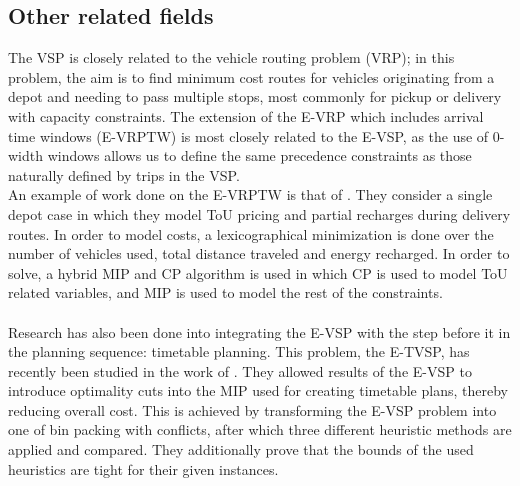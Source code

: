 \documentclass[]{article}
\begin{document}
\subsection{Other related fields}
The VSP is closely related to the vehicle routing problem (VRP); in this problem, the aim is to find minimum cost routes for vehicles originating from a depot and needing to pass multiple stops, most commonly for pickup or delivery with capacity constraints. The extension of the E-VRP which includes arrival time windows (E-VRPTW) is most closely related to the E-VSP, as the use of 0-width windows allows us to define the same precedence constraints as those naturally defined by trips in the VSP. \\
An example of work done on the E-VRPTW is that of \citet{Ham2021}. They consider a single depot case in which they model ToU pricing and partial recharges during delivery routes. In order to model costs, a lexicographical minimization is done over the number of vehicles used, total distance traveled and energy recharged. In order to solve, a hybrid MIP and CP algorithm is used in which CP is used to model ToU related variables, and MIP is used to model the rest of the constraints. \\\\
Research has also been done into integrating the E-VSP with the step before it in the planning sequence: timetable planning. This problem, the E-TVSP, has recently been studied in the work of \citet{Stadnichuk2024}. They allowed results of the E-VSP to introduce optimality cuts into the MIP used for creating timetable plans, thereby reducing overall cost. This is achieved by transforming the E-VSP problem into one of bin packing with conflicts, after which three different heuristic methods are applied and compared. They additionally prove that the bounds of the used heuristics are tight for their given instances. 
\end{document}
